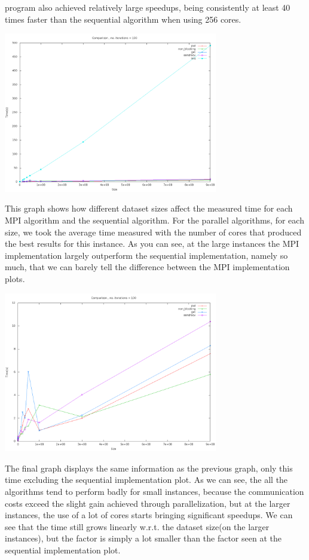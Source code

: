 \documentclass[11pt]{article}
\begin{document}
program also achieved relatively large speedups, being consistently at least 40 times faster than the sequential algorithm when using 256 cores.
\begin{center}
\includegraphics[width=0.7\textwidth]{cmpsxt.png}
\end{center}
This graph shows how different dataset sizes affect the measured time for each MPI algorithm and the sequential algorithm. For the parallel algorithms, for each size, we took the average time measured with the number of cores
that produced the best results for this instance. As you can see, at the large instances the MPI implementation largely outperform the sequential implementation, namely so much, that we can barely tell the difference between the
MPI implementation plots.
\begin{center}
\includegraphics[width=0.7\textwidth]{cmpsxtnoseq.png}
\end{center}
The final graph displays the same information as the previous graph, only this time excluding the sequential implementation plot.
As we can see, the all the algorithms tend to perform badly for small instances, because the communication costs exceed the slight gain
achieved through parallelization, but at the larger instances, the use of a lot of cores starts bringing significant speedups. We can see
that the time still grows linearly w.r.t. the dataset size(on the larger instances), but the factor is simply a lot smaller than the factor seen
at the sequential implementation plot.
\end{document}
